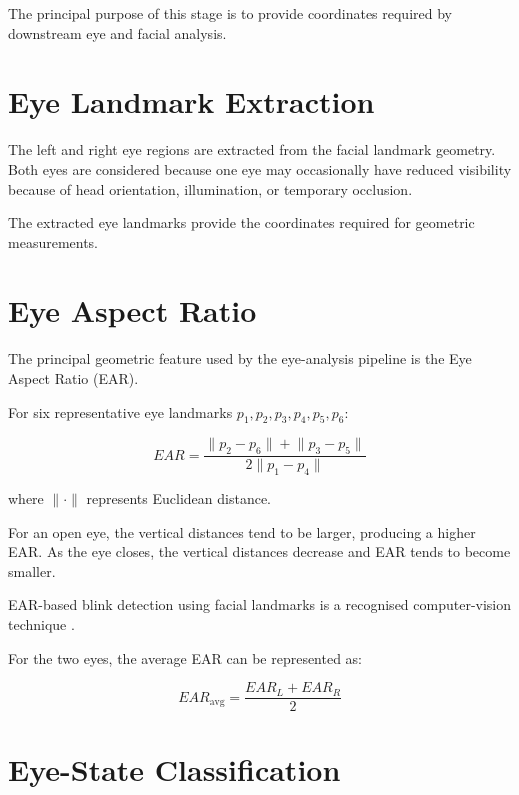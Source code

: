 \documentclass{tietreport}
\begin{document}
The principal purpose of this stage is to provide coordinates required
by downstream eye and facial analysis.


\section{Eye Landmark Extraction}

The left and right eye regions are extracted from the facial landmark
geometry. Both eyes are considered because one eye may occasionally
have reduced visibility because of head orientation, illumination, or
temporary occlusion.

The extracted eye landmarks provide the coordinates required for
geometric measurements.


\section{Eye Aspect Ratio}

The principal geometric feature used by the eye-analysis pipeline is
the Eye Aspect Ratio (EAR).

For six representative eye landmarks
$p_1,p_2,p_3,p_4,p_5,p_6$:

\begin{equation}
EAR =
\frac{
\lVert p_2-p_6\rVert
+
\lVert p_3-p_5\rVert
}{
2\lVert p_1-p_4\rVert
}
\label{eq:ear}
\end{equation}

where $\lVert\cdot\rVert$ represents Euclidean distance.

For an open eye, the vertical distances tend to be larger, producing a
higher EAR. As the eye closes, the vertical distances decrease and EAR
tends to become smaller.

EAR-based blink detection using facial landmarks is a recognised
computer-vision technique \cite{SC16}.

For the two eyes, the average EAR can be represented as:

\begin{equation}
EAR_{\mathrm{avg}}
=
\frac{
EAR_L+EAR_R
}{
2
}
\label{eq:average-ear}
\end{equation}


\section{Eye-State Classification}
\end{document}
